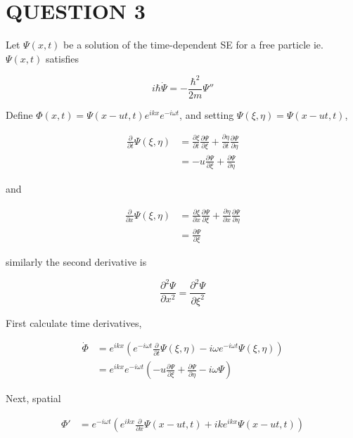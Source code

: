 \documentclass[a4paper]{article}
\begin{document}
\section{QUESTION 3}

Let $  \Psi(x,t) $ be a solution of the time-dependent SE for a free particle ie. $ \Psi(x,t) $ satisfies

\[ i \hbar \dot{\Psi} = - \frac{\hbar^{2}}{2m} \Psi'' \]

Define $ \Phi(x,t) = \Psi(x-ut,t)e^{ikx}e^{-i \omega t} $, and setting $ \Psi(\xi,\eta) = \Psi(x-ut,t) $,

\begin{align*}
\frac{\partial }{\partial t} \Psi(\xi,\eta) & = \frac{\partial \xi }{\partial t} \frac{\partial \Psi }{\partial \xi} + \frac{\partial \eta }{\partial  t}\frac{\partial \Psi}{\partial \eta}  \\
& = - u \frac{\partial \Psi }{\partial \xi} +\frac{\partial \Psi}{\partial \eta} 
\end{align*}

and 

\begin{align*}
\frac{\partial }{\partial x} \Psi(\xi,\eta) & = \frac{\partial \xi }{\partial x} \frac{\partial \Psi }{\partial \xi} + \frac{\partial \eta }{\partial  x}\frac{\partial \Psi}{\partial \eta}  \\
& = \frac{\partial \Psi }{\partial \xi} 
\end{align*}

similarly the second derivative is

\[ \frac{\partial^{2} \Psi }{\partial x^{2}} = \frac{\partial^{2} \Psi }{\partial \xi^{2}}  \]


First calculate time derivatives,

\begin{align*}
\dot{\Phi} &  = e^{ikx} \left(  e^{-i \omega t} \frac{\partial }{\partial t} \Psi(\xi,\eta) - i \omega e^{-i \omega t} \Psi(\xi,\eta)  \right)   \\
& = e^{ikx}e^{-i \omega t} \left(  - u \frac{\partial \Psi }{\partial \xi} +\frac{\partial \Psi}{\partial \eta}   - i \omega \Psi \right) 
\end{align*}

Next, spatial 

\begin{align*}
\Phi'& = e^{- i \omega t} \left(  e^{i k x } \frac{\partial }{\partial x} \Psi(x - ut,t) + i k e^{i k x} \Psi(x-ut,t)  \right)   \\ 
\end{align*}
\end{document}

